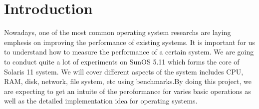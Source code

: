 \section{Introduction}


Nowadays, one of the most common operating system researchs are laying emphesis on improving the performance of existing systems. It is important for us to understand how to measure the performance of a certain system. We are going to conduct quite a lot of experiments on SunOS 5.11 which forms the core of Solaris 11 system. We will cover different aspects of the system includes CPU, RAM, disk, network, file system, etc using benchmarks.By doing this project, we are expecting to get an intuite of the peroformance for varies basic operations as well as the detailed implementation idea for operating systems.